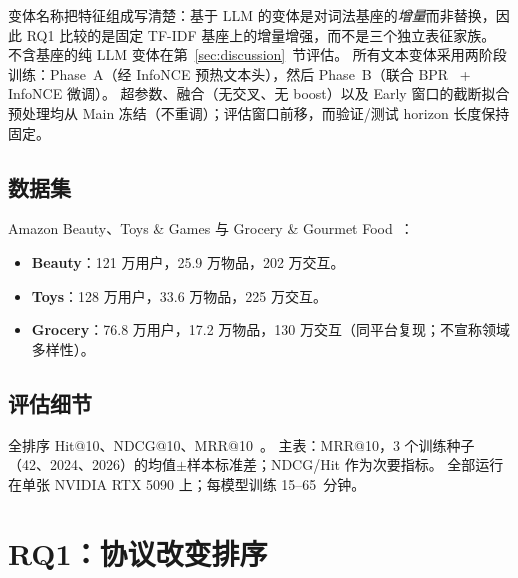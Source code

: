 \documentclass[sigconf,natbib=true,anonymous]{acmart}
\newcommand{\tfidf}{\textsc{TF-IDF}\xspace}
\begin{document}
变体名称把特征组成写清楚：基于 LLM 的变体是对词法基座的\emph{增量}而非替换，因此 RQ1 比较的是固定 \tfidf 基座上的增量增强，而不是三个独立表征家族。
不含基座的纯 LLM 变体在第~\ref{sec:discussion}~节评估。
所有文本变体采用两阶段训练：Phase~A（经 InfoNCE 预热文本头），然后 Phase~B（联合 BPR~\cite{rendle2009bpr} + InfoNCE 微调）。
超参数、融合（无交叉、无 boost）以及 Early 窗口的截断拟合预处理均从 Main 冻结（不重调）；评估窗口前移，而验证/测试 horizon 长度保持固定。

\subsection{数据集}

Amazon Beauty、Toys \& Games 与 Grocery \& Gourmet Food~\cite{mcauley2015amazon,ni2019amazon}：
\begin{itemize}[leftmargin=*,itemsep=1pt]
\item \textbf{Beauty}：121 万用户，25.9 万物品，202 万交互。
\item \textbf{Toys}：128 万用户，33.6 万物品，225 万交互。
\item \textbf{Grocery}：76.8 万用户，17.2 万物品，130 万交互（同平台复现；不宣称领域多样性）。
\end{itemize}

\subsection{评估细节}

全排序 Hit@10、NDCG@10、MRR@10~\cite{krichene2020sampledmetrics}。
主表：MRR@10，3 个训练种子（42、2024、2026）的均值$\pm$样本标准差；NDCG/Hit 作为次要指标。
全部运行在单张 NVIDIA RTX 5090 上；每模型训练 15--65~分钟。

\section{RQ1：协议改变排序}
\label{sec:rq1}
\end{document}
